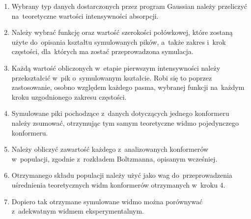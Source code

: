 \begin{enumerate}
  \item Wybrany typ danych dostarczonych przez program Gaussian należy przeliczyć na~teoretyczne
  wartości intensywności absorpcji.

  \item Należy wybrać funkcję oraz wartość szerokości połówkowej, które zostaną użyte
  do~opisania kształtu symulowanych pików, a~także zakres i~krok częstości, dla~których
  ma zostać przeprowadzona symulacja.

  \item Każdą wartość obliczonych w~etapie pierwszym intensywności należy przekształcić
  w~pik o~symulowanym kształcie. Robi się to poprzez zastosowanie, osobno względem każdego pasma,
  wybranej funkcji na~każdym kroku uzgodnionego zakresu częstości.

  \item Symulowane piki pochodzące z~danych dotyczących jednego konformeru należy zsumować,
  otrzymując tym samym teoretyczne widmo pojedynczego konformeru.

  \item Należy obliczyć zawartość każdego z~analizowanych konformerów w~populacji, zgodnie 
  z~rozkładem Boltzmanna, opisanym wcześniej.

  \item Otrzymanego składu populacji należy użyć jako wag do~przeprowadzenia uśrednienia
  teoretycznych widm konformerów otrzymanych w~kroku 4.

  \item Dopiero tak otrzymane symulowane widmo można porównywać z~adekwatnym widmem
  eksperymentalnym.
\end{enumerate}
